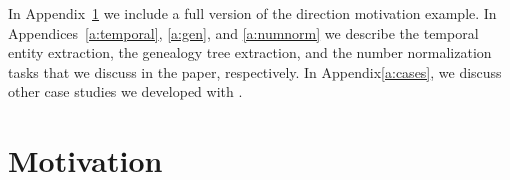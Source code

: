 


\begin{appendices}

In Appendix~\ref{a:motivation} we include a full version of the direction motivation example. 
In Appendices~\ref{a:temporal}, \ref{a:gen}, and \ref{a:numnorm} we describe the temporal entity
extraction, the genealogy tree extraction, and the number normalization tasks that we discuss 
in the paper, respectively. 
In Appendix\ref{a:cases}, we discuss other case studies we developed with \framework. 




\section{Motivation}
\label{a:motivation}

\setarab
\transfalse


\end{appendices}
